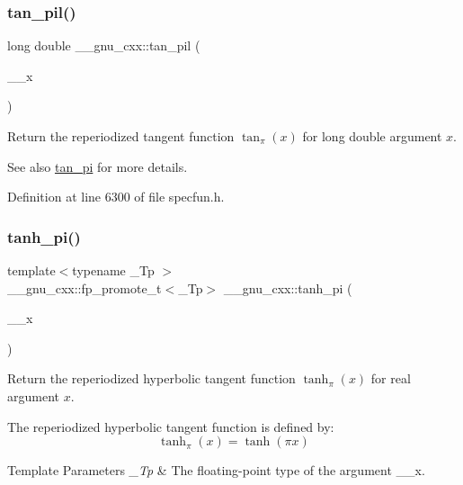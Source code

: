 \subsubsection{\texorpdfstring{tan\+\_\+pil()}{tan\_pil()}}
{\footnotesize\ttfamily long double \+\_\+\+\_\+gnu\+\_\+cxx\+::tan\+\_\+pil (\begin{DoxyParamCaption}\item[{long double}]{\+\_\+\+\_\+x }\end{DoxyParamCaption})\hspace{0.3cm}{\ttfamily [inline]}}

Return the reperiodized tangent function $ \tan_\pi(x) $ for {\ttfamily long double} argument $ x $.

\begin{DoxySeeAlso}{See also}
\hyperlink{group__gnu__math__spec__func_ga12855bd62fe6a955ef0d1d5e92c85ba9}{tan\+\_\+pi} for more details. 
\end{DoxySeeAlso}


Definition at line 6300 of file specfun.\+h.

\mbox{\label{group__gnu__math__spec__func_ga8729ffd5acf3266315e9dac1b5a9b3a6}} 
\subsubsection{\texorpdfstring{tanh\+\_\+pi()}{tanh\_pi()}}
{\footnotesize\ttfamily template$<$typename \+\_\+\+Tp $>$ \\
\+\_\+\+\_\+gnu\+\_\+cxx\+::fp\+\_\+promote\+\_\+t$<$\+\_\+\+Tp$>$ \+\_\+\+\_\+gnu\+\_\+cxx\+::tanh\+\_\+pi (\begin{DoxyParamCaption}\item[{\+\_\+\+Tp}]{\+\_\+\+\_\+x }\end{DoxyParamCaption})\hspace{0.3cm}{\ttfamily [inline]}}

Return the reperiodized hyperbolic tangent function $ \tanh_\pi(x) $ for real argument $ x $.

The reperiodized hyperbolic tangent function is defined by\+: \[ \tanh_\pi(x) = \tanh(\pi x) \]


\begin{DoxyTemplParams}{Template Parameters}
{\em \+\_\+\+Tp} & The floating-\/point type of the argument {\ttfamily \+\_\+\+\_\+x}. \\
\hline
\end{DoxyTemplParams}

